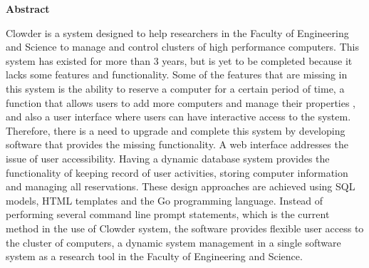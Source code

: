 \begin{center}
\textbf{\large Abstract}
\end{center}

Clowder is a system designed to help researchers in the Faculty of Engineering and Science to manage and control clusters of high performance computers. This system has existed for more than 3 years, but is yet to be completed because it lacks  some features and functionality. Some of the features that are missing in this system is the ability to reserve a computer for a certain period of time, a function that allows users to add more computers and manage their properties , and also a user interface where users can have interactive access to the system. Therefore, there is a need to upgrade and complete this system by developing software that provides the  missing functionality. A web interface addresses the issue of user accessibility. Having a dynamic database system provides the functionality of keeping record of user activities, storing computer information and managing all reservations. These design approaches are achieved using SQL models, HTML templates and the Go programming language. Instead of performing several command line prompt statements, which is the current method in the use of Clowder system, the software provides flexible user access to the cluster of computers, a dynamic system management in a single software system as a research tool in the Faculty of Engineering and Science.    

\hfill
